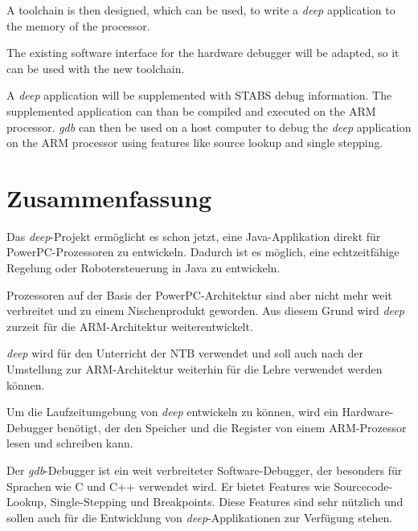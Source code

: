A toolchain is then designed, which can be used, to write a \textit{deep} application to the memory of the processor.

The existing software interface for the hardware debugger will be adapted, so it can be used with the new toolchain.

A \textit{deep} application will be supplemented with STABS debug information.
The supplemented application can than be compiled and executed on the ARM processor.
\textit{gdb} can then be used on a host computer to debug the \textit{deep} application on the ARM processor using features like source lookup and single stepping.



\chapter*{Zusammenfassung}
Das \textit{deep}-Projekt ermöglicht es schon jetzt, eine Java-Applikation direkt für PowerPC-Prozessoren zu entwickeln.
Dadurch ist es möglich, eine echtzeitfähige Regelung oder Robotersteuerung in Java zu entwickeln.

Prozessoren auf der Basis der PowerPC-Architektur sind aber nicht mehr weit verbreitet und zu einem Nischenprodukt geworden.
Aus diesem Grund wird \textit{deep} zurzeit für die ARM-Architektur weiterentwickelt.

\textit{deep} wird für den Unterricht der NTB verwendet und soll auch nach der Umstellung zur ARM-Architektur weiterhin für die Lehre verwendet werden können.

Um die Laufzeitumgebung von \textit{deep} entwickeln zu können, wird ein Hardware-Debugger benötigt, der den Speicher und die Register von einem ARM-Prozessor lesen und schreiben kann.

Der \textit{gdb}-Debugger ist ein weit verbreiteter Software-Debugger, der besonders für Sprachen wie C und C++ verwendet wird.
Er bietet Features wie Sourcecode-Lookup, Single-Stepping und Breakpoints.
Diese Features sind sehr nützlich und sollen auch für die Entwicklung von \textit{deep}-Applikationen zur Verfügung stehen.


